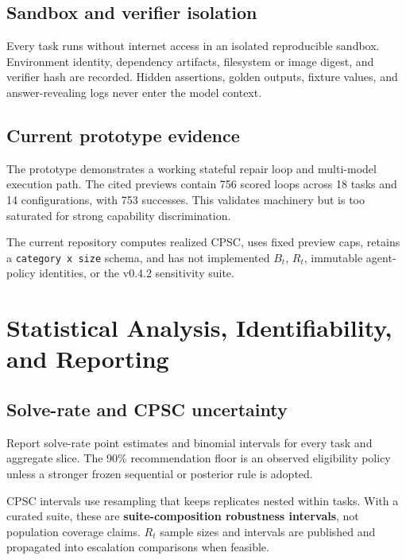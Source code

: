 \documentclass[11pt]{article}
\begin{document}
\subsection{Sandbox and verifier isolation}\hypertarget{108-sandbox-and-verifier-isolation}{}\label{108-sandbox-and-verifier-isolation}

Every task runs without internet access in an isolated reproducible sandbox. Environment identity, dependency artifacts, filesystem or image digest, and verifier hash are recorded. Hidden assertions, golden outputs, fixture values, and answer-revealing logs never enter the model context.

\subsection{Current prototype evidence}\hypertarget{109-current-prototype-evidence}{}\label{109-current-prototype-evidence}

The prototype demonstrates a working stateful repair loop and multi-model execution path. The cited previews contain 756 scored loops across 18 tasks and 14 configurations, with 753 successes. This validates machinery but is too saturated for strong capability discrimination.

The current repository computes realized CPSC, uses fixed preview caps, retains a \texttt{category x size} schema, and has not implemented $B_t$, $R_t$, immutable agent-policy identities, or the v0.4.2 sensitivity suite.

\section{Statistical Analysis, Identifiability, and Reporting}\hypertarget{11-statistical-analysis-identifiability-and-reporting}{}\label{11-statistical-analysis-identifiability-and-reporting}

\subsection{Solve-rate and CPSC uncertainty}\hypertarget{111-solve-rate-and-cpsc-uncertainty}{}\label{111-solve-rate-and-cpsc-uncertainty}

Report solve-rate point estimates and binomial intervals for every task and aggregate slice. The 90\% recommendation floor is an observed eligibility policy unless a stronger frozen sequential or posterior rule is adopted.

CPSC intervals use resampling that keeps replicates nested within tasks. With a curated suite, these are \textbf{suite-composition robustness intervals}, not population coverage claims. $R_t$ sample sizes and intervals are published and propagated into escalation comparisons when feasible.
\end{document}
